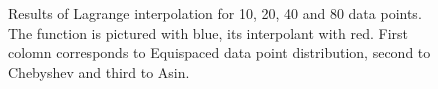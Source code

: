 \documentclass[10pt]{article}
\begin{document}
\begin{figure}[H]
\begin{minipage}[h]{0.34\linewidth}
		\end{minipage}%
		\begin{minipage}[h]{0.34\linewidth}
		\end{minipage}%
		\caption{Results of Lagrange interpolation for 10, 20, 40 and 80 data points. The function is pictured with blue, its interpolant with red. First colomn corresponds to Equispaced data point distribution, second to Chebyshev and third to Asin.}
	\end{figure}
	\newpage
\end{document}
